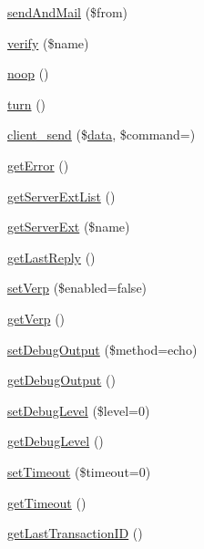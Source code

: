 \begin{DoxyCompactItemize}
\item 
\hyperlink{classPHPMailer_1_1PHPMailer_1_1SMTP_aeb1ed13869f950a99eb6a8ad5f6ff668}{send\+And\+Mail} (\$from)
\item 
\hyperlink{classPHPMailer_1_1PHPMailer_1_1SMTP_aa6f0d709ee797863db52b9e4626c7d55}{verify} (\$name)
\item 
\hyperlink{classPHPMailer_1_1PHPMailer_1_1SMTP_a2e6690a7ffca2f3b499babb48284a592}{noop} ()
\item 
\hyperlink{classPHPMailer_1_1PHPMailer_1_1SMTP_aede265071423497a511daba946ed33f5}{turn} ()
\item 
\hyperlink{classPHPMailer_1_1PHPMailer_1_1SMTP_a63f42774132e8a1f6c6fa2b7da6a91b0}{client\+\_\+send} (\$\hyperlink{classPHPMailer_1_1PHPMailer_1_1SMTP_a521b8dadc893ac68f1a3b27e54f7faaa}{data}, \$command=\textquotesingle{}\textquotesingle{})
\item 
\hyperlink{classPHPMailer_1_1PHPMailer_1_1SMTP_a5af547028637c9305509faed022da8f5}{get\+Error} ()
\item 
\hyperlink{classPHPMailer_1_1PHPMailer_1_1SMTP_a48bc761bfea302060c6d08933d83a6ef}{get\+Server\+Ext\+List} ()
\item 
\hyperlink{classPHPMailer_1_1PHPMailer_1_1SMTP_a2865c274f5d083154702fc3657387efc}{get\+Server\+Ext} (\$name)
\item 
\hyperlink{classPHPMailer_1_1PHPMailer_1_1SMTP_afd463d6247b4fde1a580fdb591e78d92}{get\+Last\+Reply} ()
\item 
\hyperlink{classPHPMailer_1_1PHPMailer_1_1SMTP_a636e17fded2c5827d8269e336f13c764}{set\+Verp} (\$enabled=false)
\item 
\hyperlink{classPHPMailer_1_1PHPMailer_1_1SMTP_a21e09a3670b678e6dd9061b5fe6152df}{get\+Verp} ()
\item 
\hyperlink{classPHPMailer_1_1PHPMailer_1_1SMTP_a3b94bb42d616ad240b54c4556ba82f29}{set\+Debug\+Output} (\$method=\textquotesingle{}echo\textquotesingle{})
\item 
\hyperlink{classPHPMailer_1_1PHPMailer_1_1SMTP_a951b3268371599c41f3bc229f378afca}{get\+Debug\+Output} ()
\item 
\hyperlink{classPHPMailer_1_1PHPMailer_1_1SMTP_a23137ea781f9b11296d28410a8b35d57}{set\+Debug\+Level} (\$level=0)
\item 
\hyperlink{classPHPMailer_1_1PHPMailer_1_1SMTP_aa82c596be3af27398f63f1e98535f083}{get\+Debug\+Level} ()
\item 
\hyperlink{classPHPMailer_1_1PHPMailer_1_1SMTP_a540b9332438a7a7429d00290cead3f01}{set\+Timeout} (\$timeout=0)
\item 
\hyperlink{classPHPMailer_1_1PHPMailer_1_1SMTP_a1315e825c8f44e97bfd57a212a063ef0}{get\+Timeout} ()
\item 
\hyperlink{classPHPMailer_1_1PHPMailer_1_1SMTP_ab0cf48b13d004a3d70fffca245bbf170}{get\+Last\+Transaction\+ID} ()
\end{DoxyCompactItemize}
